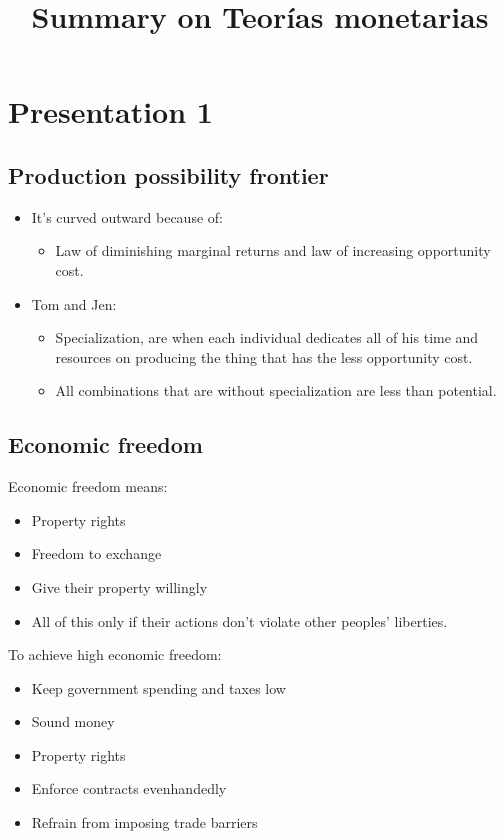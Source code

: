 \documentclass[openany]{book}
\title{Summary on Teorías monetarias}
\begin{document}

\chapter{Presentation 1}
\section{Production possibility frontier}
\begin{itemize}
    \item It's curved outward because of: 
        \begin{itemize}
            \item Law of diminishing marginal returns and law of increasing opportunity cost. 
        \end{itemize}
    
    \item Tom and Jen: 
        \begin{itemize}
            \item Specialization, are when each individual dedicates all of his time and resources on producing the thing that has the less opportunity cost. 
            \item All combinations that are without specialization are less than potential. 
        \end{itemize}
\end{itemize}

\section{Economic freedom }
Economic freedom means: 
\begin{itemize}
    \item Property rights 
    \item Freedom to exchange 
    \item Give their property willingly 
    \item All of this only if their actions don't violate other peoples' liberties. 
\end{itemize}
To achieve high economic freedom: 
\begin{itemize}
    \item Keep government spending and taxes low
    \item Sound money 
    \item Property rights 
    \item Enforce contracts evenhandedly 
    \item Refrain from imposing trade barriers 
\end{itemize}
\end{document}
